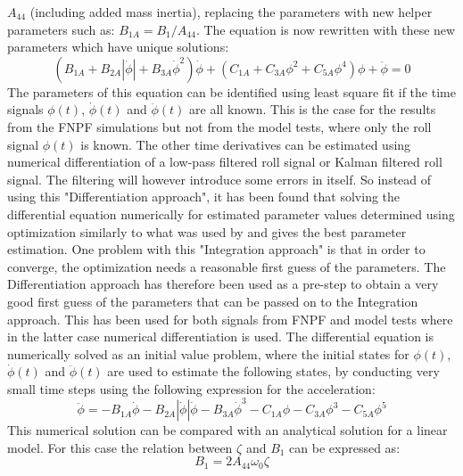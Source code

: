$A_{44}$ (including added mass inertia), replacing the parameters with
new helper parameters such as: $B_{1A} = B_1/A_{44}$. The equation is
now rewritten with these new parameters which have unique solutions:
\begin{equation}
\left(B_{1A} + B_{2A} \left|{\dot{\phi}}\right| + B_{3A} \dot{\phi}^{2}\right) \dot{\phi} + \left(C_{1A} + C_{3A} \phi^{2} + C_{5A} \phi^{4}\right) \phi + \ddot{\phi} = 0
\label{eq:roll_decay_equation_cubic_A}
\end{equation}
The parameters of this equation can be identified using least square fit
if the time signals $\phi(t)$, $\dot{\phi}(t)$ and
$\ddot{\phi}(t)$ are all known. This is the case for the results from
the FNPF simulations but not from the model tests, where only the roll
signal $\phi(t)$ is known. The other time derivatives can be estimated
using numerical differentiation of a low-pass filtered roll signal or
Kalman filtered roll signal. The filtering will however introduce some
errors in itself. So instead of using this "Differentiation approach",
it has been found that solving the differential equation numerically for
estimated parameter values determined using optimization similarly to
what was used by \citep{7505983/FJHQJJUH} and \citep{7505983/24TNAV5Z}
gives the best parameter estimation. One problem with this "Integration
approach" is that in order to converge, the optimization needs a
reasonable first guess of the parameters. The Differentiation approach
has therefore been used as a pre-step to obtain a very good first guess
of the parameters that can be passed on to the Integration approach.
This has been used for both signals from FNPF and model tests where in
the latter case numerical differentiation is used.
\quad The differential equation is numerically solved as an initial
value problem, where the initial states for $\phi(t)$,
$\dot{\phi}(t)$ and $\ddot{\phi}(t)$ are used to estimate the
following states, by conducting very small time steps using the
following expression for the acceleration:
\begin{equation}
\ddot{\phi} = - B_{1A} \dot{\phi} - B_{2A} \left|{\dot{\phi}}\right| \dot{\phi} - B_{3A} \dot{\phi}^{3} - C_{1A} \phi - C_{3A} \phi^{3} - C_{5A} \phi^{5}
\label{eq:eq_phi1d}
\end{equation}
This numerical solution can be compared with an analytical solution for
a linear model.  For this case the relation between $\zeta$ and $B_1$ can
be expressed as:
\begin{equation}
B_{1} = 2 A_{44} \omega_{0} \zeta
\label{eq:B_1_zeta_eq}
\end{equation}

